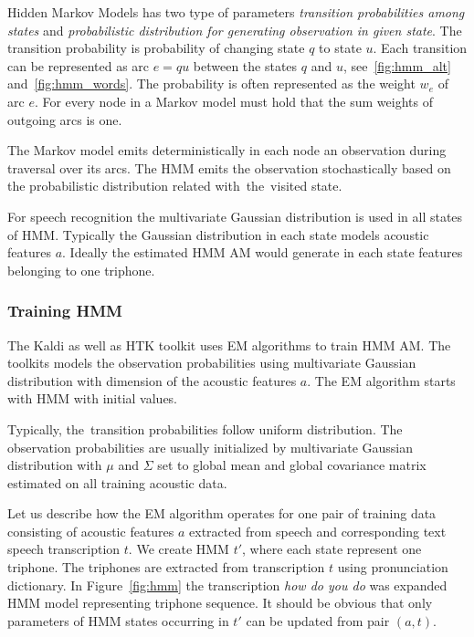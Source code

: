 {
Hidden Markov Models has two type of parameters {\it transition probabilities among states}\/
and {\it probabilistic distribution for generating observation in given state}.
The transition probability is probability of changing state $q$ to state $u$.
Each transition can be represented as arc $e=qu$ between the states $q$ and $u$, see~\ref{fig:hmm_alt} and~\ref{fig:hmm_words}.
The probability is often represented as the weight $w_e$ of arc $e$.
For every node in a Markov model must hold that the sum weights of outgoing arcs is one.

The Markov model emits deterministically in each node an observation during traversal over its arcs.
The \acl{HMM} emits the observation stochastically based on the probabilistic distribution related
with~the~visited state.

For speech recognition the multivariate Gaussian distribution is used in all states of \ac{HMM}. 
Typically the Gaussian distribution in each state models acoustic features $a$.
Ideally the estimated \ac{HMM} \ac{AM} would generate in each state features belonging to one triphone.

\subsubsection*{Training \ac{HMM}}
The Kaldi as well as \ac{HTK} toolkit uses \acl{EM} algorithms to train \ac{HMM} \acl{AM}.
The toolkits models the observation probabilities using multivariate Gaussian distribution 
with dimension of the acoustic features $a$.
The \ac{EM} algorithm starts with \ac{HMM} with initial values. 

Typically, the~transition probabilities follow uniform distribution.
The observation probabilities are usually initialized by multivariate Gaussian distribution
with $\mu$ and $\Sigma$ set to global mean and global covariance matrix 
estimated on all training acoustic data.

Let us describe how the \ac{EM} algorithm operates for one pair
of training data consisting of acoustic features $a$ extracted from speech
and corresponding text speech transcription $t$.
We create \ac{HMM} $t'$, where each state represent one triphone. The triphones are extracted from transcription $t$ using pronunciation dictionary.
In Figure~\ref{fig:hmm} the transcription {\it how do you do} was expanded \ac{HMM} model representing triphone sequence.
It should be obvious that only parameters of HMM states occurring in $t'$ can be updated from pair $(a, t)$.

}
